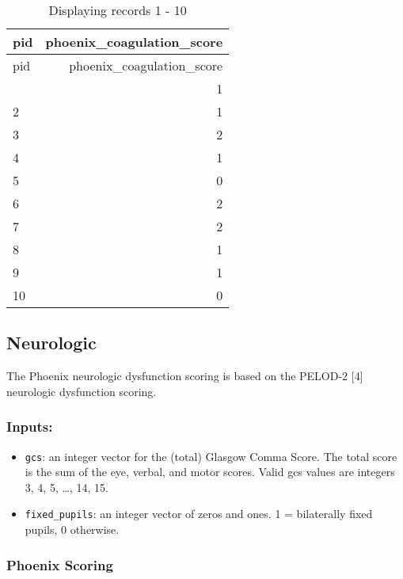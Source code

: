 \documentclass[
  letterpaper,
  DIV=11,
  numbers=noendperiod]{scrartcl}
\begin{document}
\begin{longtable}[]{@{}lr@{}}
\caption{Displaying records 1 - 10}\tabularnewline
\toprule\noalign{}
pid & phoenix\_coagulation\_score \\
\midrule\noalign{}
\endfirsthead
\toprule\noalign{}
pid & phoenix\_coagulation\_score \\
\midrule\noalign{}
\endhead
\bottomrule\noalign{}
\endlastfoot
1 & 1 \\
2 & 1 \\
3 & 2 \\
4 & 1 \\
5 & 0 \\
6 & 2 \\
7 & 2 \\
8 & 1 \\
9 & 1 \\
10 & 0 \\
\end{longtable}

\subsection{Neurologic}\label{neurologic}

The Phoenix neurologic dysfunction scoring is based on the PELOD-2
{[}4{]} neurologic dysfunction scoring.

\subsubsection{Inputs:}\label{inputs-3}

\begin{itemize}
\item
  \texttt{gcs}: an integer vector for the (total) Glasgow Comma Score.
  The total score is the sum of the eye, verbal, and motor scores. Valid
  gcs values are integers 3, 4, 5, \ldots, 14, 15.
\item
  \texttt{fixed\_pupils}: an integer vector of zeros and ones. 1 =
  bilaterally fixed pupils, 0 otherwise.
\end{itemize}

\subsubsection{Phoenix Scoring}\label{phoenix-scoring-3}
\end{document}
